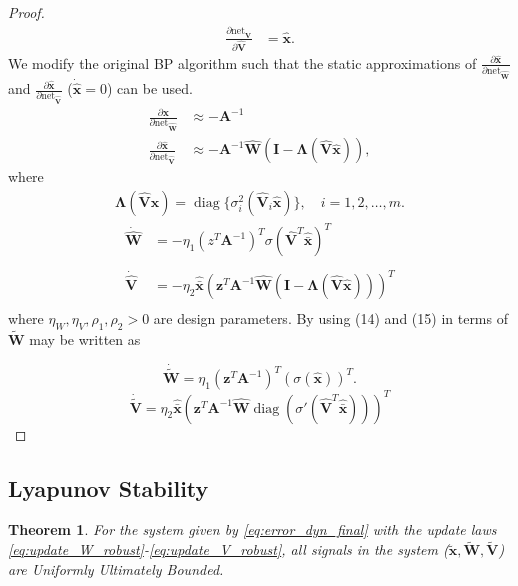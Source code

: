 \documentclass[11pt, a4paper]{article}
\newtheorem{theorem}{Theorem}
\newcommand{\xtilde}{\tilde{\bm{x}}}
\newcommand{\xhatbar}{\hat{\bar{\bm{x}}}}
\newcommand{\Wtilde}{\tilde{\mathbf{W}}}
\newcommand{\What}{\hat{\mathbf{W}}}
\newcommand{\Vtilde}{\tilde{\mathbf{V}}}
\newcommand{\Vhat}{\hat{\mathbf{V}}}
\newcommand{\diag}{\operatorname{diag}}
\begin{document}
\begin{proof}
\begin{align}
    \frac{\partial \text{net}_{\hat{\mathbf{V}}}}{\partial \hat{\mathbf{V}}} &= \hat{\bm{x}}.
\end{align}
We modify the original BP algorithm such that the static approximations of $\frac{\partial \hat{\bm{x}}}{\partial \text{net}_{\hat{\mathbf{W}}}}$ and $\frac{\partial \hat{\bm{x}}}{\partial \text{net}_{\hat{\mathbf{V}}}}$ ($\dot{\hat{\bm{x}}} = 0$) can be used.
\begin{align}
    \frac{\partial \hat{\bm{x}}}{\partial \text{net}_{\hat{\mathbf{W}}}} &\approx -\mathbf{A}^{-1} \nonumber \\
    \frac{\partial \hat{\bm{x}}}{\partial \text{net}_{\hat{\mathbf{V}}}} &\approx -\mathbf{A}^{-1}\hat{\mathbf{W}}(\mathbf{I} - \mathbf{\Lambda}(\hat{\mathbf{V}}\hat{\bm{x}})), 
\end{align}
where
\begin{align}
    \mathbf{\Lambda}(\hat{\mathbf{V}}\hat{\bm{x}}) = \diag\{\sigma_i^2(\hat{\mathbf{V}}_i\hat{\bm{x}})\}, \quad i=1,2,\dots,m.
\end{align}
\begin{align}
    \dot{\What} &= -\eta_1 \left(z^{T} \bm{A}^{-1}  \right)^{T} \sigma(\Vhat^T\xhatbar)^T \\\label{eq:update_W_robust}\\
    \dot{\Vhat} &= -\eta_2 \xhatbar \left( \bm{z}^T \bm{A}^{-1} \What (\mathbf{I} - \mathbf{\Lambda}(\hat{\mathbf{V}}\hat{\bm{x}})) \right)^T \\\label{eq:update_V_robust}
\end{align}
where $\eta_W, \eta_V, \rho_1, \rho_2 > 0$ are design parameters. By using (14) and (15) in terms of $\tilde{\mathbf{W}}$ may be written as

\begin{equation}
    \dot{\tilde{\mathbf{W}}} = \eta_1 ({\bm{z}}^T \mathbf{A}^{-1})^T (\sigma(\hat{\bm{x}}))^T .
\end{equation}
\begin{equation}
    \dot{\tilde{\mathbf{V}}} = \eta_2 \xhatbar \left( \bm{z}^T \bm{A}^{-1} \What \diag(\sigma'(\Vhat^T\xhatbar)) \right)^T
\end{equation}
\end{proof}
\subsection{Lyapunov Stability}

\begin{theorem}
For the system given by \eqref{eq:error_dyn_final} with the update laws \eqref{eq:update_W_robust}-\eqref{eq:update_V_robust}, all signals in the system ($\xtilde, \Wtilde, \Vtilde$) are Uniformly Ultimately Bounded.
\end{theorem}
\end{document}
